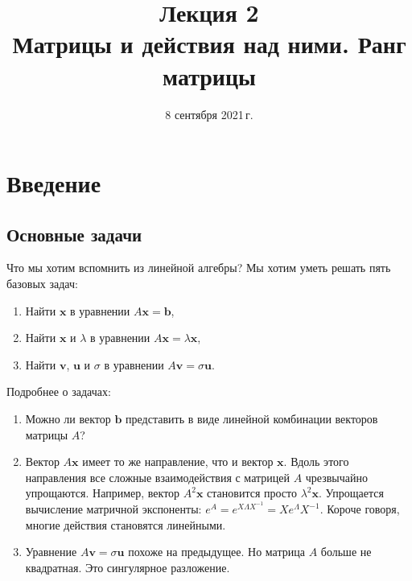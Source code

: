 \documentclass[11pt,a4paper]{article}
\title{
      Лекция 2 \\
      Матрицы и действия над ними. Ранг
матрицы
    }
\date{8 сентября 2021\,г.}
\begin{document}
\maketitle
\thispagestyle{empty}
\tableofcontents
\pagebreak


\hypertarget{ux432ux432ux435ux434ux435ux43dux438ux435}{%
\section{Введение}\label{ux432ux432ux435ux434ux435ux43dux438ux435}}

\hypertarget{ux43eux441ux43dux43eux432ux43dux44bux435-ux437ux430ux434ux430ux447ux438}{%
\subsection{Основные
задачи}\label{ux43eux441ux43dux43eux432ux43dux44bux435-ux437ux430ux434ux430ux447ux438}}

Что мы хотим вспомнить из линейной алгебры? Мы хотим уметь решать пять
базовых задач:

\begin{enumerate}
\def\labelenumi{\arabic{enumi}.}
\item
  Найти \(\mathbf{x}\) в уравнении \(A\mathbf{x} = \mathbf{b}\),
\item
  Найти \(\mathbf{x}\) и \(\lambda\) в уравнении
  \(A\mathbf{x} = \lambda \mathbf{x}\),
\item
  Найти \(\mathbf{v}\), \(\mathbf{u}\) и \(\sigma\) в уравнении
  \(A\mathbf{v} = \sigma \mathbf{u}\).
\end{enumerate}

Подробнее о задачах:
\begin{enumerate}
\item
  Можно ли вектор \(\mathbf{b}\) представить в виде линейной комбинации
  векторов матрицы \(A\)?
\item
  Вектор \(A\mathbf{x}\) имеет то же направление, что и вектор
  \(\mathbf{x}\). Вдоль этого направления все сложные взаимодействия с
  матрицей \(A\) чрезвычайно упрощаются. Например, вектор
  \(A^2 \mathbf{x}\) становится просто \(\lambda^2 \mathbf{x}\).
  Упрощается вычисление матричной экспоненты:
  \(e^{A} = e^{X \Lambda X^{-1}} = X e^{\Lambda} X^{-1}\). Короче
  говоря, многие действия становятся линейными.
\item
  Уравнение \(A\mathbf{v} = \sigma \mathbf{u}\) похоже на предыдущее. Но
  матрица \(A\) больше не квадратная. Это сингулярное разложение.
\end{enumerate}
\end{document}
